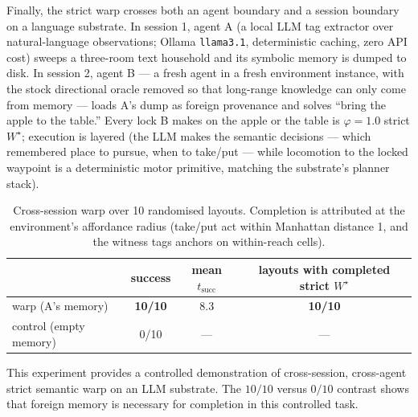 \documentclass{article}
\newcommand{\method}[1]{\texttt{#1}}
\newcommand{\wstar}{W^{\star}}
\begin{document}
Finally, the strict warp crosses both an agent boundary and a session
boundary on a language substrate. In session 1, agent A (a local
LLM tag extractor over natural-language observations; Ollama
\method{llama3.1}, deterministic caching, zero API cost) sweeps a
three-room text household and its symbolic memory is dumped to disk.
In session 2, agent B --- a fresh agent in a fresh environment
instance, with the stock directional oracle removed so that long-range
knowledge can only come from memory --- loads A's dump as foreign
provenance and solves ``bring the apple to the table.'' Every lock B
makes on the apple or the table is $\varphi{=}1.0$ strict $\wstar$;
execution is layered (the LLM makes the semantic decisions --- which
remembered place to pursue, when to take/put --- while locomotion to
the locked waypoint is a deterministic motor primitive, matching the
substrate's planner stack).

\begin{table}[h]
\centering
\caption{Cross-session warp over 10 randomised layouts. Completion is
attributed at the environment's affordance radius (take/put act within
Manhattan distance 1, and the witness tags anchors on within-reach
cells).}
\label{p2:tab:llm}
\small
\begin{tabular}{lccc}
\toprule
 & success & mean $t_{\text{succ}}$ & layouts with completed strict $\wstar$ \\
\midrule
warp (A's memory) & \textbf{10/10} & 8.3 & \textbf{10/10} \\
control (empty memory) & 0/10 & --- & --- \\
\bottomrule
\end{tabular}
\end{table}

This experiment provides a controlled demonstration of cross-session,
cross-agent strict semantic warp on an LLM substrate. The $10/10$
versus $0/10$ contrast shows that foreign memory is necessary for completion in this controlled task.
\end{document}
